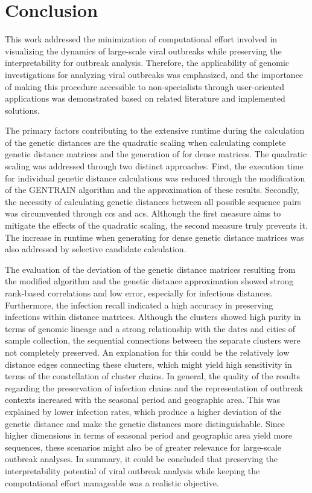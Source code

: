 \section{Conclusion}
\label{cha:conclusion}
This work addressed the minimization of computational effort involved in visualizing the dynamics of large-scale viral outbreaks while preserving the interpretability for outbreak analysis. Therefore, the applicability of genomic investigations for analyzing viral outbreaks was emphasized, and the importance of making this procedure accessible to non-specialists through user-oriented applications was demonstrated based on related literature and implemented solutions. 

The primary factors contributing to the extensive runtime during the calculation of the genetic distances are the quadratic scaling when calculating complete genetic distance matrices and the generation of  for dense matrices. The quadratic scaling was addressed through two distinct approaches. First, the execution time for individual genetic distance calculations was reduced through the modification of the GENTRAIN algorithm and the approximation of these results. Secondly, the necessity of calculating genetic distances between all possible sequence pairs was circumvented through \acrshort{ccs} and \acrshort{acs}. Although the first measure aims to mitigate the effects of the quadratic scaling, the second measure truly prevents it.
The increase in runtime when generating  for dense genetic distance matrices was also addressed by selective candidate calculation. 

The evaluation of the deviation of the genetic distance matrices resulting from the modified algorithm and the genetic distance approximation showed strong rank-based correlations and low error, especially for infectious distances. Furthermore, the infection recall indicated a high accuracy in preserving infections within distance matrices. Although the clusters showed high purity in terms of genomic lineage and a strong relationship with the dates and cities of sample collection, the sequential connections between the separate clusters were not completely preserved. An explanation for this could be the relatively low distance edges connecting these clusters, which might yield high sensitivity in terms of the constellation of cluster chains. In general, the quality of the results regarding the preservation of infection chains and the representation of outbreak contexts increased with the seasonal period and geographic area. This was explained by lower infection rates, which produce a higher deviation of the genetic distance and make the genetic distances more distinguishable. Since higher dimensions in terms of seasonal period and geographic area yield more sequences, these scenarios might also be of greater relevance for large-scale outbreak analyses. In summary, it could be concluded that preserving the interpretability potential of viral outbreak analysis while keeping the computational effort manageable was a realistic objective. 

